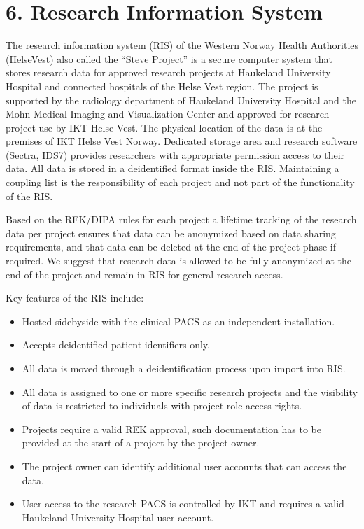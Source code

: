 \documentclass[letterpaper,10pt,english]{sphinxmanual}
\begin{document}
\section{6. Research Information System}
\label{\detokenize{EndUser/index:research-information-system}}
\sphinxAtStartPar
The research information system (RIS) of the Western Norway Health Authorities (Helse\sphinxhyphen{}Vest) also called the “Steve Project” is a secure computer system that stores research data for approved research projects at Haukeland University Hospital and connected hospitals of the Helse Vest region. The project is supported by the radiology department of Haukeland University Hospital and the Mohn Medical Imaging and Visualization Center and approved for research project use by IKT Helse Vest. The physical location of the data is at the premises of IKT Helse Vest Norway. Dedicated storage area and research software (Sectra, IDS7) provides researchers with appropriate permission access to their data. All data is stored in a de\sphinxhyphen{}identified format inside the RIS. Maintaining a coupling list is the responsibility of each project and not part of the functionality of the RIS.

\sphinxAtStartPar
Based on the REK/DIPA rules for each project a lifetime tracking of the research data per project ensures that data can be anonymized based on data sharing requirements, and that data can be deleted at the end of the project phase \sphinxhyphen{} if required. We suggest that research data is allowed to be fully anonymized at the end of the project and remain in RIS for general research access.

\sphinxAtStartPar
Key features of the RIS include:
\begin{itemize}
\item {} 
\sphinxAtStartPar
Hosted side\sphinxhyphen{}by\sphinxhyphen{}side with the clinical PACS as an independent installation.

\item {} 
\sphinxAtStartPar
Accepts de\sphinxhyphen{}identified patient identifiers only.

\item {} 
\sphinxAtStartPar
All data is moved through a de\sphinxhyphen{}identification process upon import into RIS.

\item {} 
\sphinxAtStartPar
All data is assigned to one or more specific research projects and the visibility of data is restricted to individuals with project role access rights.

\item {} 
\sphinxAtStartPar
Projects require a valid REK approval, such documentation has to be provided at the start of a project by the project owner.

\item {} 
\sphinxAtStartPar
The project owner can identify additional user accounts that can access the data.

\item {} 
\sphinxAtStartPar
User access to the research PACS is controlled by IKT and requires a valid Haukeland University Hospital user account.

\end{itemize}
\end{document}
